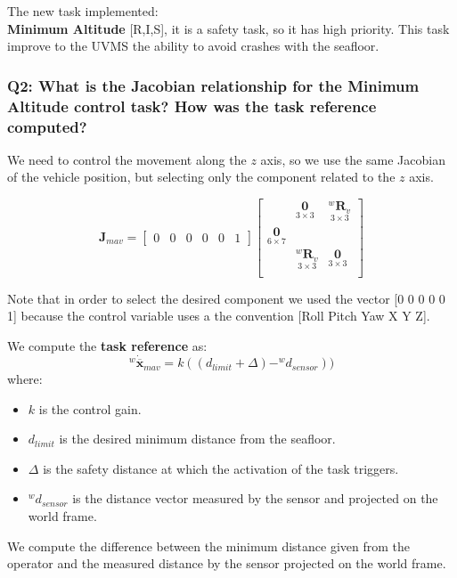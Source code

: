 \documentclass{article}
\begin{document}
\noindent
\vspace{5px}
The new task implemented: \\
\textbf{Minimum Altitude} [R,I,S], it is a safety task, so it has high priority. This task improve to the UVMS the ability to avoid crashes with the seafloor.

\subsubsection{Q2: What is the Jacobian relationship for the Minimum Altitude control task? How was the task reference computed?}
We need to control the movement along the $z$ axis, so we use the same Jacobian of the vehicle position, but selecting only the component related to the $z$ axis.

\begin{equation}
\boldsymbol{J}_{mav}=\begin{bmatrix} 0 & 0 & 0 & 0 & 0 & 1
\end{bmatrix}
    \begin{bmatrix}
     & \underset{3\times 3}{\boldsymbol{0}} & \underset{ 3\times 3}{^{w}\boldsymbol{R}_{v}} \\
     \underset{ 6\times 7}{\boldsymbol{0}} \\
     & \underset{ 3\times 3}{^{w}\boldsymbol{R}_{v}} & \underset{3\times 3}{\boldsymbol{0}} \\
    \end{bmatrix}
\end{equation}

Note that in order to select the desired component we used the vector [0 0 0 0 0 1] because the control variable uses a the convention [Roll Pitch Yaw X Y Z].

\noindent
\vspace{5px}
We compute the \textbf{task reference} as: 
\begin{equation}
    ^{w}\dot{\overline{\boldsymbol{x}}}_{mav} = k((d_{limit}+\Delta)- ^w d_{sensor})) %
\end{equation}
where:
\begin{itemize}
    \item $k$ is the control gain.
    \item $d_{limit}$ is the desired minimum distance from the seafloor.
    \item $ \Delta $ is the safety distance at which the activation of the task triggers.
    \item $^w d_{sensor}$ is the distance vector measured by the sensor and projected on the world frame.
\end{itemize} 
We compute the difference between the minimum distance given from the operator and the measured distance by the sensor projected on the world frame.
\end{document}

